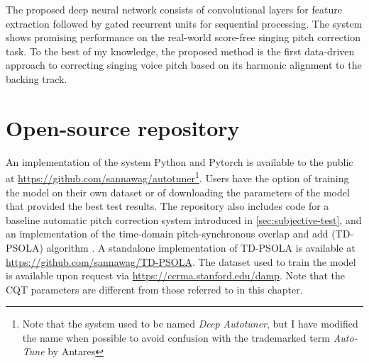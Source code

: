 The proposed deep neural network consists of convolutional layers for feature extraction followed by gated recurrent units for sequential processing. The system shows promising performance on the real-world score-free singing pitch correction task. To the best of my knowledge, the proposed method is the first data-driven approach to correcting singing voice pitch based on its harmonic alignment to the backing track.

\section{Open-source repository}
An implementation of the system Python and Pytorch is available to the public at \url{https://github.com/sannawag/autotuner}\footnote{Note that the system used to be named \textit{Deep Autotuner}, but I have modified the name when possible to avoid confusion with the trademarked term \textit{Auto-Tune} by Antares}. Users have the option of training the model on their own dataset or of downloading the parameters of the model that provided the best test results. The repository also includes code for a baseline automatic pitch correction system introduced in \ref{sec:subjective-test}, and an implementation of the time-domain pitch-synchronous overlap and add (TD-PSOLA) algorithm \cite{charpentier1986diphone}. A standalone implementation of TD-PSOLA is available at \url{https://github.com/sannawag/TD-PSOLA}. The dataset used to train the model is available upon request via \url{https://ccrma.stanford.edu/damp}. Note that the CQT parameters are different from those referred to in this chapter.

